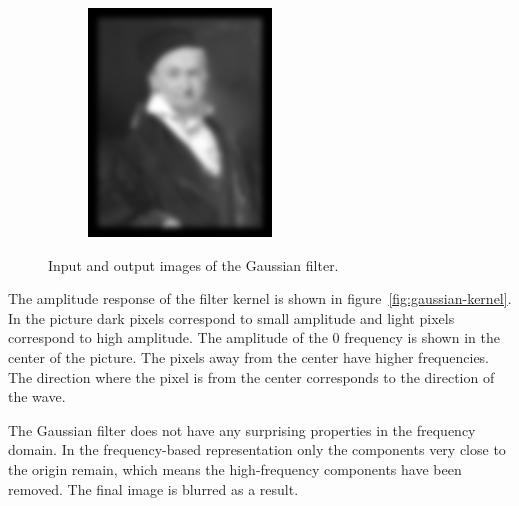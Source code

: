 \documentclass[]{article}
\begin{document}
\begin{figure}
\begin{subfigure}[t]{0.49\textwidth}
      \includegraphics[width=0.99\linewidth]{output.png}
    \end{subfigure}
    \caption{Input and output images of the Gaussian filter.}
\end{figure}

The amplitude response of the filter kernel is shown in
figure~\ref{fig:gaussian-kernel}. In the picture dark pixels correspond to small
amplitude and light pixels correspond to high amplitude. The amplitude of the 0
frequency is shown in the center of the picture. The pixels away from the center
have higher frequencies. The direction where the pixel is from the center
corresponds to the direction of the wave.

The Gaussian filter does not have any surprising properties in the frequency
domain. In the frequency-based representation only the components very close to
the origin remain, which means the high-frequency components have been removed.
The final image is blurred as a result.
\end{document}
